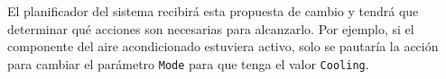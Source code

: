 El planificador del sistema recibirá esta propuesta de cambio y tendrá que determinar qué acciones son necesarias para alcanzarlo. Por ejemplo, si el componente del aire acondicionado estuviera activo, solo se pautaría la acción para cambiar el parámetro \texttt{Mode} para que tenga el valor \texttt{Cooling}.
